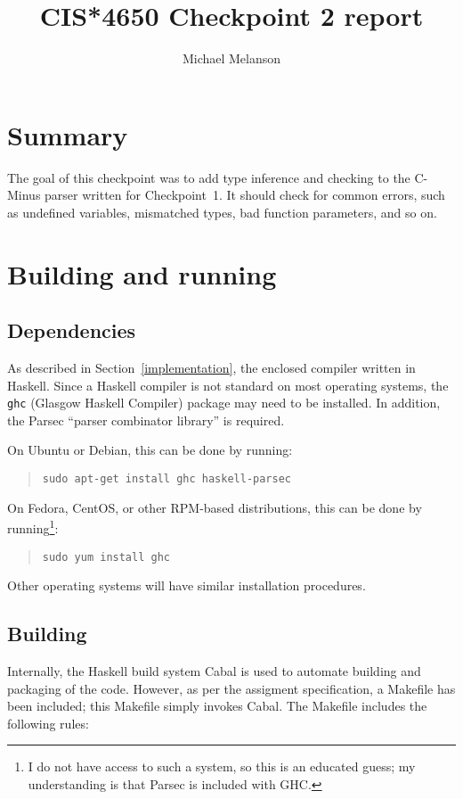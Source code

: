\documentclass[12pt]{amsart}
\title{CIS*4650 Checkpoint 2 report}
\author{Michael Melanson}
\begin{document}
\maketitle

\section{Summary}
The goal of this checkpoint was to add type inference and checking to
the C-Minus parser written for Checkpoint~1. It should check for
common errors, such as undefined variables, mismatched types, bad
function parameters, and so on.


\section{Building and running}

\subsection{Dependencies}
As described in Section~\ref{implementation}, the enclosed compiler
written in Haskell. Since a Haskell compiler is not standard on most
operating systems, the \verb|ghc| (Glasgow Haskell Compiler) package
may need to be installed. In addition, the Parsec ``parser combinator
library'' is required.

On Ubuntu or Debian, this can be done by running:
\begin{verse}
\verb|sudo apt-get install ghc haskell-parsec|
\end{verse}

On Fedora, CentOS, or other RPM-based distributions, this can be done
by running\footnote{I do not have access to such a system, so this is
  an educated guess; my understanding is that Parsec is included with
  GHC.}:
\begin{verse}
\verb|sudo yum install ghc|
\end{verse}

Other operating systems will have similar installation procedures.

\subsection{Building}
Internally, the Haskell build system Cabal is used to automate
building and packaging of the code. However, as per the assigment
specification, a Makefile has been included; this Makefile simply
invokes Cabal. The Makefile includes the following rules:
\end{document}
